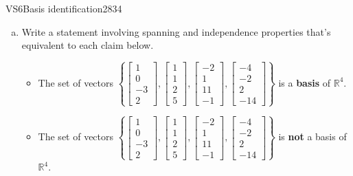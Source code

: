 \begin{exercise}{VS6}{Basis identification}{2834} 
\begin{exerciseStatement} 

\begin{enumerate}[(a)]
\item  

 Write a statement involving spanning and independence properties that's equivalent to each claim below. 

 

\begin{itemize}
\item  

 The set of vectors \(\left\{ \left[\begin{array}{c}
1 \\
0 \\
-3 \\
2
\end{array}\right] , \left[\begin{array}{c}
1 \\
1 \\
2 \\
5
\end{array}\right] , \left[\begin{array}{c}
-2 \\
1 \\
11 \\
-1
\end{array}\right] , \left[\begin{array}{c}
-4 \\
-2 \\
2 \\
-14
\end{array}\right] \right\}\) is a \textbf{basis} of \(\mathbb{R}^4\). 

 
\item  

 The set of vectors \(\left\{ \left[\begin{array}{c}
1 \\
0 \\
-3 \\
2
\end{array}\right] , \left[\begin{array}{c}
1 \\
1 \\
2 \\
5
\end{array}\right] , \left[\begin{array}{c}
-2 \\
1 \\
11 \\
-1
\end{array}\right] , \left[\begin{array}{c}
-4 \\
-2 \\
2 \\
-14
\end{array}\right] \right\}\) is \textbf{not} a basis of \(\mathbb{R}^4\). 


\end{itemize}
\end{enumerate}
\end{exerciseStatement}
\end{exercise}
